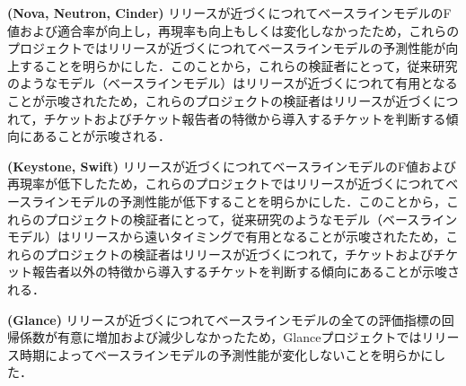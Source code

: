 \documentclass[11pt]{jreport}
\begin{document}
\textbf{ (Nova, Neutron, Cinder) }リリースが近づくにつれてベースラインモデルのF値および適合率が向上し，再現率も向上もしくは変化しなかったため，これらのプロジェクトではリリースが近づくにつれてベースラインモデルの予測性能が向上することを明らかにした．このことから，これらの検証者にとって，従来研究\cite{prioritizer}のようなモデル（ベースラインモデル）はリリースが近づくにつれて有用となることが示唆されたため，これらのプロジェクトの検証者はリリースが近づくにつれて，チケットおよびチケット報告者の特徴から導入するチケットを判断する傾向にあることが示唆される．

\textbf{ (Keystone, Swift) }リリースが近づくにつれてベースラインモデルのF値および再現率が低下したため，これらのプロジェクトではリリースが近づくにつれてベースラインモデルの予測性能が低下することを明らかにした．このことから，これらのプロジェクトの検証者にとって，従来研究\cite{prioritizer}のようなモデル（ベースラインモデル）はリリースから遠いタイミングで有用となることが示唆されたため，これらのプロジェクトの検証者はリリースが近づくにつれて，チケットおよびチケット報告者以外の特徴から導入するチケットを判断する傾向にあることが示唆される．

\textbf{ (Glance) }リリースが近づくにつれてベースラインモデルの全ての評価指標の回帰係数が有意に増加および減少しなかったため，Glanceプロジェクトではリリース時期によってベースラインモデルの予測性能が変化しないことを明らかにした．


\begin{table}[t]
\caption{各プロジェクトの導入予測モデルにおける評価指標の回帰係数の分類}
\label{table:merge_seino_jikeiretsu}
\centering
\vspace{0.5zh}
\end{table}
\end{document}

